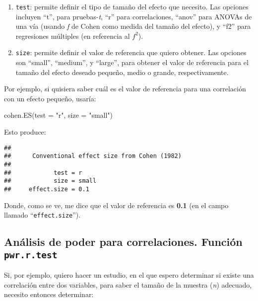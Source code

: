 \documentclass[
]{article}
\newenvironment{Shaded}{\begin{snugshade}}{\end{snugshade}}
\newcommand{\AttributeTok}[1]{\textcolor[rgb]{0.16,0.50,0.73}{#1}}
\newcommand{\FunctionTok}[1]{\textcolor[rgb]{0.56,0.27,0.68}{#1}}
\newcommand{\NormalTok}[1]{\textcolor[rgb]{0.81,0.81,0.76}{#1}}
\newcommand{\StringTok}[1]{\textcolor[rgb]{0.96,0.31,0.31}{#1}}
\begin{document}
\begin{enumerate}
\def\labelenumi{\arabic{enumi}.}
\item
  \texttt{test}: permite definir el tipo de tamaño del efecto que
  necesito. Las opciones incluyen ``t'', para pruebas-\emph{t}, ``r''
  para correlaciones, ``anov'' para ANOVAs de una vía (usando \emph{f}
  de Cohen como medida del tamaño del efecto), y ``f2'' para regresiones
  múltiples (en referencia al \(f^2\)).
\item
  \texttt{size}: permite definir el valor de referencia que quiero
  obtener. Las opciones son ``small'', ``medium'', y ``large'', para
  obtener el valor de referencia para el tamaño del efecto deseado
  pequeño, medio o grande, respectivamente.
\end{enumerate}

Por ejemplo, si quisiera saber cuál es el valor de referencia para una
correlación con un efecto pequeño, usaría:

\begin{Shaded}
\begin{Highlighting}[]
\FunctionTok{cohen.ES}\NormalTok{(}\AttributeTok{test =} \StringTok{"r"}\NormalTok{, }\AttributeTok{size =} \StringTok{"small"}\NormalTok{)}
\end{Highlighting}
\end{Shaded}

Esto produce:

\begin{verbatim}
## 
##      Conventional effect size from Cohen (1982) 
## 
##            test = r
##            size = small
##     effect.size = 0.1
\end{verbatim}

Donde, como se ve, me dice que el valor de referencia es \textbf{0.1}
(en el campo llamado ``\texttt{effect.size}'').

\hypertarget{anuxe1lisis-de-poder-para-correlaciones.-funciuxf3n-pwr.r.test}{%
\subsection{\texorpdfstring{Análisis de poder para correlaciones.
Función
\texttt{pwr.r.test}}{Análisis de poder para correlaciones. Función pwr.r.test}}\label{anuxe1lisis-de-poder-para-correlaciones.-funciuxf3n-pwr.r.test}}

Si, por ejemplo, quiero hacer un estudio, en el que espero determinar si
existe una correlación entre dos variables, para saber el tamaño de la
muestra (\emph{n}) adecuado, necesito entonces determinar:
\end{document}
